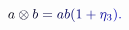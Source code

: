 \documentclass[12pt]{article}
\begin{document}
\makeatletter
\renewcommand*{\@textcolor}[3]{%
  \protect\leavevmode
  \begingroup
    \color#1{#2}#3%
  \endgroup
}
\makeatother
\begin{displaymath}
\mathcolor[RGB]{0,0,15}{a} \mathcolor[RGB]{0,0,30}{\otimes} \mathcolor[RGB]{0,0,45}{b} \mathcolor[RGB]{0,0,60}{=} \mathcolor[RGB]{0,0,75}{a} \mathcolor[RGB]{0,0,90}{b} \mathcolor[RGB]{0,0,105}{(} \mathcolor[RGB]{0,0,120}{1} \mathcolor[RGB]{0,0,135}{+} \mathcolor[RGB]{0,0,150}{\eta} _ { \mathcolor[RGB]{0,0,165}{3} } \mathcolor[RGB]{0,0,180}{)} \mathcolor[RGB]{0,0,195}{.}
\end{displaymath}
\end{document}
